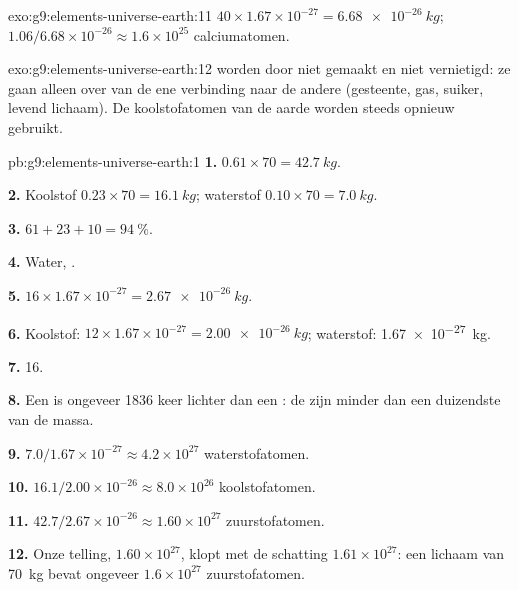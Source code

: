 \begin{solution}{exo:g9:elements-universe-earth:11}
$40 \times 1.67 \times 10^{-27} = \qty{6.68e-26}{kg}$;
$1.06 / 6.68 \times 10^{-26} \approx 1.6 \times 10^{25}$ calciumatomen.
\end{solution}

\begin{solution}{exo:g9:elements-universe-earth:12}
 worden door  niet gemaakt en niet
vernietigd: ze gaan alleen over van de ene verbinding naar de andere
(gesteente, gas, suiker, levend lichaam). De koolstofatomen van de aarde
worden steeds opnieuw gebruikt.
\end{solution}

\begin{solution}{pb:g9:elements-universe-earth:1}
\textbf{1.} $0.61 \times 70 = \qty{42.7}{kg}$.

\textbf{2.} Koolstof $0.23 \times 70 = \qty{16.1}{kg}$; waterstof
$0.10 \times 70 = \qty{7.0}{kg}$.

\textbf{3.} $61 + 23 + 10 = \qty{94}{\percent}$.

\textbf{4.} Water, .

\textbf{5.} $16 \times 1.67 \times 10^{-27} = \qty{2.67e-26}{kg}$.

\textbf{6.} Koolstof: $12 \times 1.67 \times 10^{-27} = \qty{2.00e-26}{kg}$;
waterstof: \qty{1.67e-27}{kg}.

\textbf{7.} 16.

\textbf{8.} Een  is ongeveer 1836 keer lichter dan een :
de  zijn minder dan een duizendste van de massa.

\textbf{9.} $7.0 / 1.67 \times 10^{-27} \approx 4.2 \times 10^{27}$
waterstofatomen.

\textbf{10.} $16.1 / 2.00 \times 10^{-26} \approx 8.0 \times 10^{26}$
koolstofatomen.

\textbf{11.} $42.7 / 2.67 \times 10^{-26} \approx 1.60 \times 10^{27}$
zuurstofatomen.

\textbf{12.} Onze telling, $1.60 \times 10^{27}$, klopt met de schatting
$1.61 \times 10^{27}$: een lichaam van \qty{70}{kg} bevat ongeveer $1.6 \times
10^{27}$ zuurstofatomen.
\end{solution}

